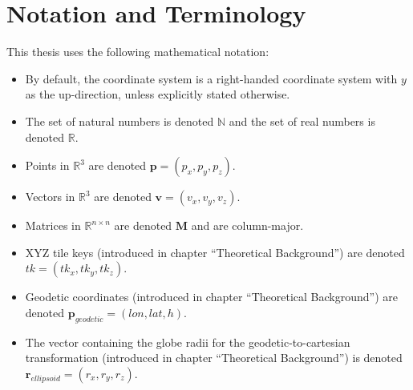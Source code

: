 \section{Notation and Terminology}
This thesis uses the following mathematical notation:
\begin{itemize}
  \item By default, the coordinate system is a right-handed coordinate system with $y$ as the
  up-direction, unless explicitly stated otherwise.
  \item The set of natural numbers is denoted $\mathbb{N}$ and the set of real numbers is denoted $\mathbb{R}$.
  \item Points in $\mathbb{R}^3$ are denoted $\mathbf{p} = (p_x, p_y, p_z)$.
  \item Vectors in $\mathbb{R}^3$ are denoted $\mathbf{v} = (v_x, v_y, v_z)$.
  \item Matrices in $\mathbb{R}^{n \times n}$ are denoted $\mathbf{M}$ and are column-major.
  \item XYZ tile keys (introduced in chapter ``Theoretical Background'') are denoted $tk = (tk_x, tk_y, tk_z)$.
  \item Geodetic coordinates (introduced in chapter ``Theoretical Background'') are denoted $\mathbf{p}_{geodetic} = (lon,lat,h)$.
  \item The vector containing the globe radii for the geodetic-to-cartesian transformation (introduced in chapter ``Theoretical Background'') is denoted $\mathbf{r}_{ellipsoid} = (r_x, r_y, r_z)$.
\end{itemize}

